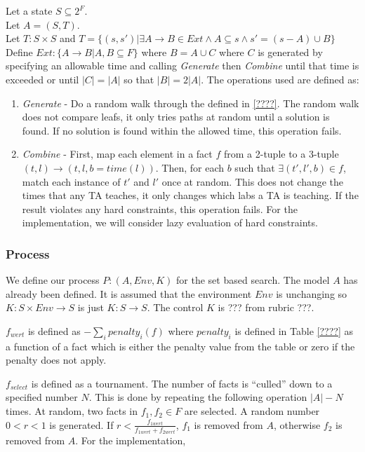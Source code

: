 \documentclass{article}
\begin{document}
Let a state $S \subseteq 2^F$.\\

Let $A = (S, T)$.\\

Let $T: S \times S$ and $T = \{ (s,s')| \exists A \to B \in Ext \land A
\subseteq s \land s' =(s-A) \cup B \}$ \\


Define $Ext : \lbrace A \to B | A,B \subseteq F \rbrace$ where $B = A
\cup C$ where $C$ is generated by specifying an allowable time and
calling \textit{Generate} then \textit{Combine} until that time is
exceeded or until $|C| = |A|$ so that $|B| = 2|A|$. The operations
used are defined as:

\begin{enumerate}

\item \textit{Generate} - Do a random walk through the defined in
  \ref{????}. The random walk does not compare leafs, it only tries
  paths at random until a solution is found. If no solution is found
  within the allowed time, this operation fails.

\item \textit{Combine} - First, map each element in a fact $f$ from a
  2-tuple to a 3-tuple $(t, l) \to (t, l, b = time(l))$. Then, for
  each $b$ such that $\exists (t',l',b) \in f$, match each instance of
  $t'$ and $l'$ once at random. This does not change the times that
  any TA teaches, it only changes which labs a TA is teaching. If the
  result violates any hard constraints, this operation fails. For the
  implementation, we will consider lazy evaluation of hard
  constraints.
\end{enumerate}


\subsubsection{Process}

We define our process $P: (A, Env, K)$ for the set based search. The
model $A$ has already been defined. It is assumed that the environment
$Env$ is unchanging so $K: S \times Env \to S$ is just $K: S \to S$.
The control $K$ is ??? from rubric ???.

$f_{wert}$ is defined as $-\sum\limits_{i}^{} penalty_i(f)$ where $
penalty_i$ is defined in Table \ref{????} as a function of a fact
which is either the penalty value from the table or zero if the
penalty does not apply.

$f_{select}$ is defined as a tournament. The number of facts is
``culled'' down to a specified number $N$. This is done by repeating
the following operation $|A|-N$ times. At random, two facts in $f_1,
f_2 \in F$ are selected. A random number $0 < r < 1$ is generated. If
$r < \frac{f_{1wert}}{f_{1wert} + f_{2wert}}$, $f_1$ is removed from
$A$, otherwise $f_2$ is removed from $A$. For the implementation,
\end{document}
